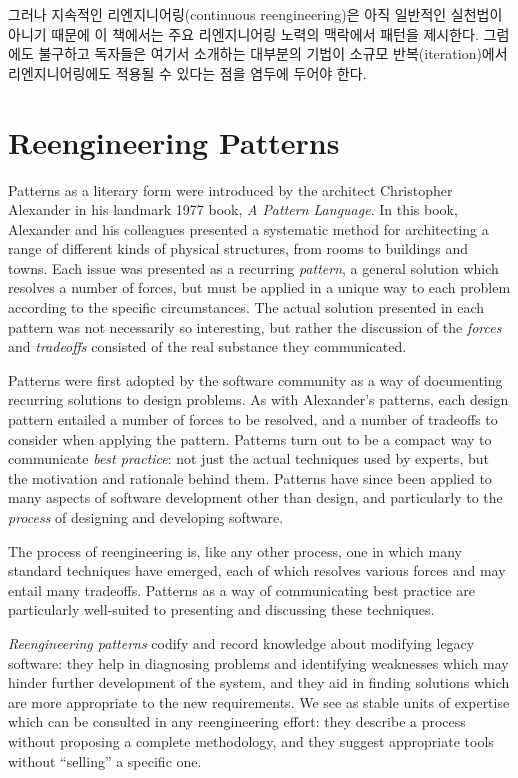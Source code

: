 \documentclass[a4paper,10pt,twoside]{book}
\begin{document}
그러나 지속적인 리엔지니어링(continuous reengineering)은 아직 일반적인 실천법이 아니기 때문에 이 책에서는 주요 리엔지니어링 노력의 맥락에서 패턴을 제시한다. 그럼에도 불구하고 독자들은 여기서 소개하는 대부분의 기법이 소규모 반복(iteration)에서 리엔지니어링에도 적용될 수 있다는 점을 염두에 두어야 한다.

\section{Reengineering Patterns}

Patterns as a literary form were introduced by the architect Christopher Alexander in his landmark 1977 book, \emph{A Pattern Language}. In this book, Alexander and his colleagues presented a systematic method for architecting a range of different kinds of physical structures, from rooms to buildings and towns. Each issue was presented as a recurring \emph{pattern}, a general solution which resolves a number of forces, but must be applied in a unique way to each problem according to the specific circumstances. The actual solution presented in each pattern was not necessarily so interesting, but rather the discussion of the \emph{forces} and \emph{tradeoffs} consisted of the real substance they communicated.

Patterns were first adopted by the software community as a way of documenting recurring solutions to design problems. As with Alexander's patterns, each design pattern entailed a number of forces to be resolved, and a number of tradeoffs to consider when applying the pattern. Patterns turn out to be a compact way to communicate \emph{best practice}: not just the actual techniques used by experts, but the motivation and rationale behind them. Patterns have since been applied to many aspects of software development other than design, and particularly to the \emph{process} of designing and developing software.

The process of reengineering is, like any other process, one in which many standard techniques have emerged, each of which resolves various forces and may entail many tradeoffs. Patterns as a way of communicating best practice are particularly well-suited to presenting and discussing these techniques. 

\emph{Reengineering patterns} codify and record knowledge about modifying legacy software: they help in diagnosing problems and identifying weaknesses which may hinder further development of the system, and they aid in finding solutions which are more appropriate to the new requirements. We see  as stable units of expertise which can be consulted in any reengineering effort: they describe a process without proposing a complete methodology, and they suggest appropriate tools without ``selling'' a specific one. 
\end{document}

